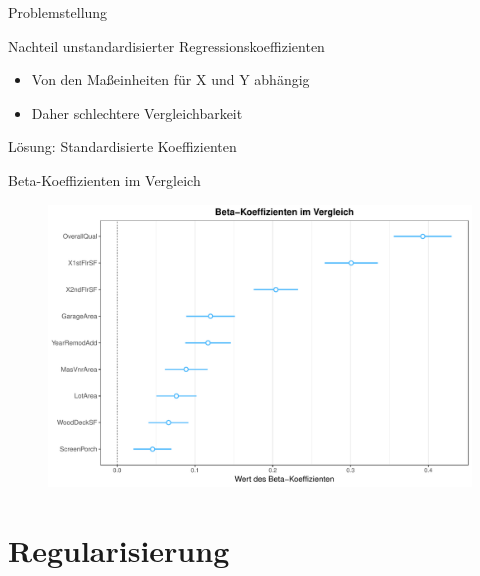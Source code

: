 \documentclass[10pt]{beamer}
\begin{document}
\begin{frame}{Problemstellung}
	
	\begin{Large}{Nachteil unstandardisierter Regressionskoeffizienten}\end{Large}
	
	  \begin{itemize}
		\item Von den Maßeinheiten für X und Y abhängig
		\item Daher schlechtere Vergleichbarkeit
	  \end{itemize}
	 
	\begin{Large}{Lösung: Standardisierte Koeffizienten}\end{Large}
	  
	
\end{frame}

\begin{frame}{Beta-Koeffizienten im Vergleich}
	
	\begin{figure}
		\includegraphics[width=\textwidth, keepaspectratio]{figures/beta_koeffizienten}
	\end{figure}

\end{frame}


\section{Regularisierung}
\end{document}
